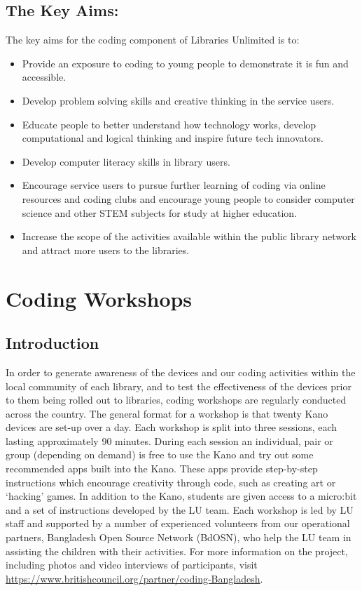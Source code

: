 \documentclass[12pt]{report} %
\begin{document}
\section{The Key Aims:}
The key aims for the coding component of Libraries Unlimited is to:
\begin{itemize}
\item Provide an exposure to coding to young people to demonstrate it is fun and accessible.
\item Develop problem solving skills and creative thinking in the service users.
\item Educate people to better understand how technology works, develop computational and logical thinking and inspire future tech innovators.
\item Develop computer literacy skills in library users. 
\item Encourage service users to pursue further learning of coding via online resources and coding clubs and encourage young people to consider computer science and other STEM subjects for study at higher education.
\item Increase the scope of the activities available within the public library network and attract more users to the libraries.
\end{itemize}


\chapter{Coding Workshops}
\section{Introduction}
In order to generate awareness of the devices and our coding activities within the local community of each library, and to test the effectiveness of the devices prior to them being rolled out to libraries, coding workshops are regularly conducted across the country. The general format for a workshop is that twenty Kano devices are set-up over a day. Each workshop is split into three sessions, each lasting approximately 90 minutes. During each session an individual, pair or group (depending on demand) is free to use the Kano and try out some recommended apps built into the Kano. These apps provide step-by-step instructions which encourage creativity through code, such as creating art or `hacking' games. In addition to the Kano, students are given access to a micro:bit and a set of instructions developed by the LU team. Each workshop is led by LU staff and supported by a number of experienced volunteers from our operational partners, Bangladesh Open Source Network (BdOSN), who help the LU team in assisting the children with their activities. For more information on the project, including photos and video interviews of participants, visit \url{https://www.britishcouncil.org/partner/coding-Bangladesh}.
\end{document}
